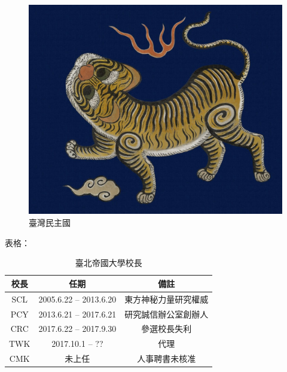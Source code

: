 \documentclass[]{nd}
\begin{document}
\begin{figure}[htp]
    \begin{center}
        \includegraphics[width=450pt]{tiger.jpeg}
        \caption{臺灣民主國}
        \label{fig:arch_02}
    \end{center}
\end{figure}

表格：

\begin{table}[htbp]
\centering
\begin{tabular}{ccc}
校長 & 任期 & 備註\\
\hline
SCL & 2005.6.22 -- 2013.6.20 & 東方神秘力量研究權威\\
PCY & 2013.6.21 -- 2017.6.21 & 研究誠信辦公室創辦人\\
CRC & 2017.6.22 -- 2017.9.30 & 參選校長失利\\
TWK & 2017.10.1 -- ?? & 代理\\
CMK & 未上任 & 人事聘書未核准\\
\end{tabular}
\caption{臺北帝國大學校長}
\end{table}

\nocite{*}
\printbibliography[heading=bibintoc]
\end{document}
